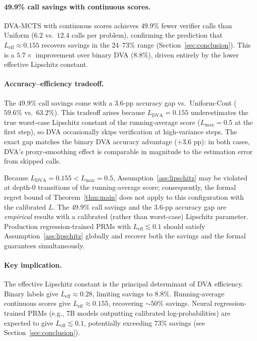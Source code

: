 \paragraph{49.9\% call savings with continuous scores.}
DVA-MCTS with continuous scores achieves $\mathbf{49.9\%}$ fewer verifier calls
than Uniform ($6.2$ vs.\ $12.4$ calls per problem), confirming the prediction
that $L_{\text{eff}} \approx 0.155$ recovers savings in the $24$--$73\%$ range
(Section~\ref{sec:conclusion}).  This is a $5.7\times$ improvement over binary DVA
($8.8\%$), driven entirely by the lower effective Lipschitz constant.

\paragraph{Accuracy--efficiency tradeoff.}
The $49.9\%$ call savings come with a $3.6$-pp accuracy gap vs.\ Uniform-Cont
($59.6\%$ vs.\ $63.2\%$).  This tradeoff arises because $L_{\text{DVA}}{=}0.155$
underestimates the true worst-case Lipschitz constant of the running-average score
($L_{\max}{=}0.5$ at the first step), so DVA occasionally skips verification at
high-variance steps.  The exact gap matches the binary DVA accuracy advantage
($+3.6$ pp): in both cases, DVA's proxy-smoothing effect is comparable in
magnitude to the estimation error from skipped calls.

\begin{remark}
Because $L_{\text{DVA}}{=}0.155 < L_{\max}{=}0.5$, Assumption~\ref{ass:lipschitz}
may be violated at depth-0 transitions of the running-average score; consequently,
the formal regret bound of Theorem~\ref{thm:main} does not apply to this
configuration with the calibrated $L$.
The $49.9\%$ call savings and the $3.6$-pp accuracy gap are \emph{empirical} results
with a calibrated (rather than worst-case) Lipschitz parameter.
Production regression-trained PRMs with $L_{\text{eff}} \lesssim 0.1$ should
satisfy Assumption~\ref{ass:lipschitz} globally and recover both the savings
and the formal guarantees simultaneously.
\end{remark}

\paragraph{Key implication.}
The effective Lipschitz constant is the principal determinant of DVA efficiency.
Binary labels give $L_{\text{eff}}\approx 0.28$, limiting savings to $8.8\%$.
Running-average continuous scores give $L_{\text{eff}}\approx 0.155$, recovering
$\sim50\%$ savings.  Neural regression-trained PRMs (e.g., $7$B models outputting
calibrated log-probabilities) are expected to give $L_{\text{eff}} \lesssim 0.1$,
potentially exceeding $73\%$ savings (see Section~\ref{sec:conclusion}).

